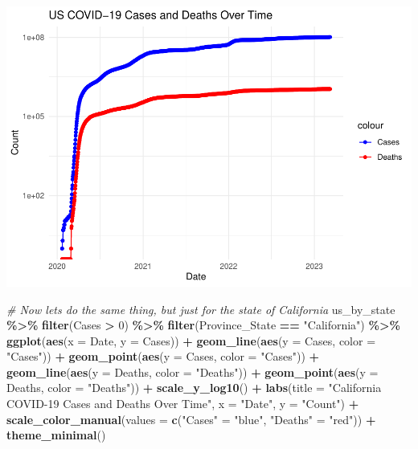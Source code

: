\documentclass[
]{article}
\newenvironment{Shaded}{\begin{snugshade}}{\end{snugshade}}
\newcommand{\AttributeTok}[1]{\textcolor[rgb]{0.13,0.29,0.53}{#1}}
\newcommand{\CommentTok}[1]{\textcolor[rgb]{0.56,0.35,0.01}{\textit{#1}}}
\newcommand{\DecValTok}[1]{\textcolor[rgb]{0.00,0.00,0.81}{#1}}
\newcommand{\FunctionTok}[1]{\textcolor[rgb]{0.13,0.29,0.53}{\textbf{#1}}}
\newcommand{\NormalTok}[1]{#1}
\newcommand{\OtherTok}[1]{\textcolor[rgb]{0.56,0.35,0.01}{#1}}
\newcommand{\SpecialCharTok}[1]{\textcolor[rgb]{0.81,0.36,0.00}{\textbf{#1}}}
\newcommand{\StringTok}[1]{\textcolor[rgb]{0.31,0.60,0.02}{#1}}
\begin{document}
\includegraphics{covid-data-analysis_files/figure-latex/us-visualizations-1.pdf}

\begin{Shaded}
\begin{Highlighting}[]
\CommentTok{\# Now lets do the same thing, but just for the state of California}
\NormalTok{us\_by\_state }\SpecialCharTok{\%\textgreater{}\%}
  \FunctionTok{filter}\NormalTok{(Cases }\SpecialCharTok{\textgreater{}} \DecValTok{0}\NormalTok{) }\SpecialCharTok{\%\textgreater{}\%}
  \FunctionTok{filter}\NormalTok{(Province\_State }\SpecialCharTok{==} \StringTok{"California"}\NormalTok{) }\SpecialCharTok{\%\textgreater{}\%}
  \FunctionTok{ggplot}\NormalTok{(}\FunctionTok{aes}\NormalTok{(}\AttributeTok{x =}\NormalTok{ Date, }\AttributeTok{y =}\NormalTok{ Cases)) }\SpecialCharTok{+}
  \FunctionTok{geom\_line}\NormalTok{(}\FunctionTok{aes}\NormalTok{(}\AttributeTok{y =}\NormalTok{ Cases, }\AttributeTok{color =} \StringTok{"Cases"}\NormalTok{)) }\SpecialCharTok{+}
  \FunctionTok{geom\_point}\NormalTok{(}\FunctionTok{aes}\NormalTok{(}\AttributeTok{y =}\NormalTok{ Cases, }\AttributeTok{color =} \StringTok{"Cases"}\NormalTok{)) }\SpecialCharTok{+}
  \FunctionTok{geom\_line}\NormalTok{(}\FunctionTok{aes}\NormalTok{(}\AttributeTok{y =}\NormalTok{ Deaths, }\AttributeTok{color =} \StringTok{"Deaths"}\NormalTok{)) }\SpecialCharTok{+}
  \FunctionTok{geom\_point}\NormalTok{(}\FunctionTok{aes}\NormalTok{(}\AttributeTok{y =}\NormalTok{ Deaths, }\AttributeTok{color =} \StringTok{"Deaths"}\NormalTok{)) }\SpecialCharTok{+}
  \FunctionTok{scale\_y\_log10}\NormalTok{() }\SpecialCharTok{+}
  \FunctionTok{labs}\NormalTok{(}\AttributeTok{title =} \StringTok{"California COVID{-}19 Cases and Deaths Over Time"}\NormalTok{,}
       \AttributeTok{x =} \StringTok{"Date"}\NormalTok{,}
       \AttributeTok{y =} \StringTok{"Count"}\NormalTok{) }\SpecialCharTok{+}
  \FunctionTok{scale\_color\_manual}\NormalTok{(}\AttributeTok{values =} \FunctionTok{c}\NormalTok{(}\StringTok{"Cases"} \OtherTok{=} \StringTok{"blue"}\NormalTok{, }\StringTok{"Deaths"} \OtherTok{=} \StringTok{"red"}\NormalTok{)) }\SpecialCharTok{+}
  \FunctionTok{theme\_minimal}\NormalTok{()}
\end{Highlighting}
\end{Shaded}
\end{document}
